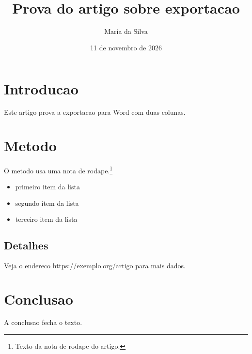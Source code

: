 \documentclass[11pt,a4paper,twocolumn]{article}
\title{Prova do artigo sobre exportacao}
\author{Maria da Silva}
\date{11 de novembro de 2026}
\begin{document}
\maketitle
\section{Introducao}
Este artigo prova a exportacao para Word com duas colunas. \lipsum[1-2]
\section{Metodo}\label{sec:metodo}
O metodo usa uma nota de rodape.\footnote{Texto da nota de rodape do artigo.} \lipsum[3]
\begin{itemize}
\item primeiro item da lista
\item segundo item da lista
\item terceiro item da lista
\end{itemize}
\lipsum[4-5]
\subsection{Detalhes}
Veja o endereco \url{https://exemplo.org/artigo} para mais dados. \lipsum[6-7]
\section{Conclusao}
A conclusao fecha o texto. \lipsum[8-9]
\end{document}
